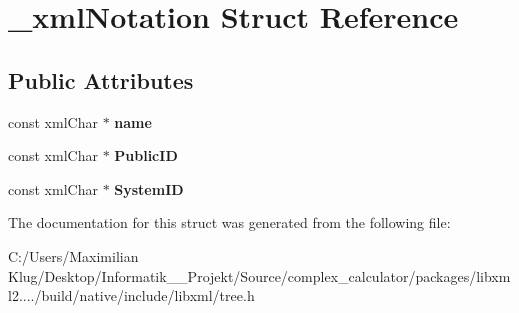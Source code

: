 \hypertarget{struct__xml_notation}{}\section{\+\_\+xml\+Notation Struct Reference}
\label{struct__xml_notation}
\subsection*{Public Attributes}
\begin{DoxyCompactItemize}
\item 
\mbox{\label{struct__xml_notation_a15130985f4574a2cbb600c1d42461ee9}} 
const xml\+Char $\ast$ {\bfseries name}
\item 
\mbox{\label{struct__xml_notation_a66aa8801ce658a57f9139599fc8fb80f}} 
const xml\+Char $\ast$ {\bfseries Public\+ID}
\item 
\mbox{\label{struct__xml_notation_a521da3fcb5b3f193a00a9782c1fe5ff7}} 
const xml\+Char $\ast$ {\bfseries System\+ID}
\end{DoxyCompactItemize}


The documentation for this struct was generated from the following file\+:\begin{DoxyCompactItemize}
\item 
C\+:/\+Users/\+Maximilian Klug/\+Desktop/\+Informatik\+\_\+\_\+\+Projekt/\+Source/complex\+\_\+calculator/packages/libxml2..../build/native/include/libxml/tree.\+h\end{DoxyCompactItemize}
